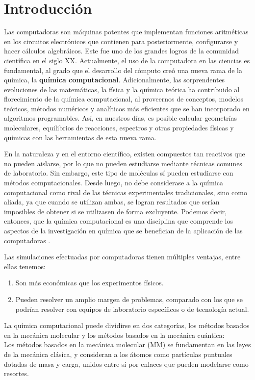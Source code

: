 \chapter{Introducción}

Las computadoras son máquinas potentes que implementan funciones aritméticas
en los circuitos electrónicos que contienen para posteriormente, configurarse y hacer cálculos 
algebráicos. Este fue uno de los grandes logros de la comunidad científica en el siglo XX.
Actualmente, el uso de la computadora en las ciencias es fundamental, al grado que el desarrollo
del cómputo creó una nueva rama de la química, la \textbf{química computacional}.
Adicionalmente, las sorprendentes evoluciones de las matemáticas, la física y la química teórica ha contribuido al florecimiento de la química computacional, al proveernos de conceptos, modelos
teóricos, métodos numéricos y analíticos más eficientes que se han incorporado en algoritmos
programables. Así, en nuestros días, es posible calcular geometrías moleculares, equilibrios de
reacciones, espectros y otras propiedades físicas y químicas con las herramientas de esta nueva
rama. 

En la naturaleza y en el entorno científico, existen compuestos tan reactivos que no pueden
aislarse, por lo que no pueden estudiarse mediante técnicas comunes de laboratorio. Sin embargo, este tipo de moléculas sí pueden estudiarse con métodos computacionales. Desde luego, no debe considerase a la química computacional como rival de las técnicas experimentales tradicionales, sino como aliada, ya que cuando se utilizan ambas, se logran resultados que serían imposibles de obtener si se utilizasen de forma excluyente. Podemos decir, entonces, que la química computacional es una disciplina que comprende los aspectos de la investigación en química que se benefician de la aplicación de las computadoras \cite{Cuevas2003}. 

Las simulaciones efectuadas por computadoras tienen múltiples ventajas, entre ellas tenemos:
\begin{enumerate}
\item Son más económicas que los experimentos físicos.
\item Pueden resolver un amplio margen de problemas, comparado con los que se podrían resolver con equipos de laboratorio específicos o de tecnología actual. 
\end{enumerate}

La química computacional puede dividirse en dos categorías, los métodos basados en la mecánica molecular y los métodos basados en la mecánica cuántica:
\\Los métodos basados en la mecánica molecular (MM) se fundamentan en las leyes de la mecánica
clásica, y consideran a los átomos como partículas puntuales dotadas de masa y carga, unidos
entre sí por enlaces que pueden modelarse como resortes.

